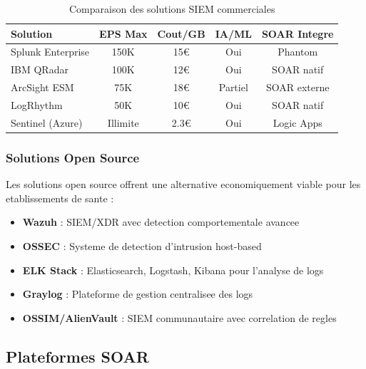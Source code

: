 \begin{table}[H]
    \centering
    \caption{Comparaison des solutions SIEM commerciales}
    \begin{tabular}{|l|c|c|c|c|}
        \hline
        \textbf{Solution} & \textbf{EPS Max} & \textbf{Cout/GB} & \textbf{IA/ML} & \textbf{SOAR Integre} \\
        \hline
        Splunk Enterprise & 150K             & 15€              & Oui            & Phantom               \\
        \hline
        IBM QRadar        & 100K             & 12€              & Oui            & SOAR natif            \\
        \hline
        ArcSight ESM      & 75K              & 18€              & Partiel        & SOAR externe          \\
        \hline
        LogRhythm         & 50K              & 10€              & Oui            & SOAR natif            \\
        \hline
        Sentinel (Azure)  & Illimite         & 2.3€             & Oui            & Logic Apps            \\
        \hline
    \end{tabular}
\end{table}

\subsubsection{Solutions Open Source}

Les solutions open source offrent une alternative economiquement viable pour les etablissements de sante :

\begin{itemize}
    \item \textbf{Wazuh} : SIEM/XDR avec detection comportementale avancee
    \item \textbf{OSSEC} : Systeme de detection d'intrusion host-based
    \item \textbf{ELK Stack} : Elasticsearch, Logstash, Kibana pour l'analyse de logs
    \item \textbf{Graylog} : Plateforme de gestion centralisee des logs
    \item \textbf{OSSIM/AlienVault} : SIEM communautaire avec correlation de regles
\end{itemize}

\subsection{Plateformes SOAR}

